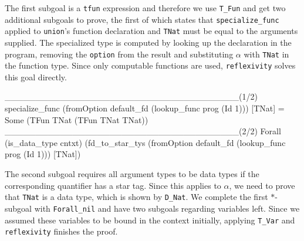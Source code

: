 \documentclass[paper = a4, fleqn, abstract=on, twoside]{scrreprt}
\newcommand{\coqinline}[1]{\texttt{#1}}
\begin{document}
The first subgoal is a \coqinline{tfun} expression and therefore we use \coqinline{T_Fun} and get two additional subgoals to prove, the first of which states that \coqinline{specialize_func} applied to \texttt{union}'s function declaration and \texttt{TNat} must be equal to the arguments supplied. The specialized type is computed by looking up the declaration in the program, removing the \coqinline{option} from the result and substituting $\alpha$ with \coqinline{TNat} in the function type. Since only computable functions are used, \coqinline{reflexivity} solves this goal directly.
\begin{coqcode}
______________________________________(1/2)
specialize_func (fromOption default_fd (lookup_func prog (Id 1))) [TNat] =
Some (TFun TNat (TFun TNat TNat))
______________________________________(2/2)
Forall (is_data_type cntxt)
(fd_to_star_tys (fromOption default_fd (lookup_func prog (Id 1))) [TNat])
\end{coqcode}
The second subgoal requires all argument types to be data types if the corresponding quantifier has a star tag. Since this applies to $\alpha$, we need to prove that \coqinline{TNat} is a data type, which is shown by \coqinline{D_Nat}. We complete the first $*$-subgoal with \coqinline{Forall_nil} and have two subgoals regarding variables left. Since we assumed these variables to be bound in the context initially, applying \coqinline{T_Var} and \coqinline{reflexivity} finishes the proof.
\end{document}

